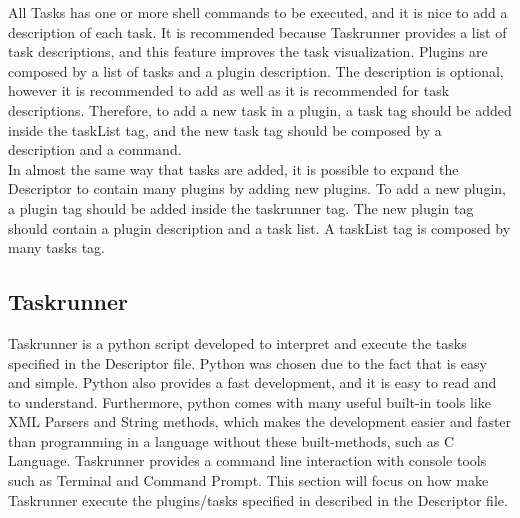 \documentclass[a4paper, 12pt]{article}
\begin{document}
\clearpage



	All Tasks has one or more shell commands to be executed, and it is nice to add a description of each task. It is recommended because Taskrunner provides
a list of task descriptions, and this feature improves the task visualization. Plugins are composed by a list of tasks and a plugin description. The
description is optional, however it is recommended to add as well as it is recommended for task descriptions. Therefore, to add a new task in a plugin,
a task tag should be added inside the taskList tag, and the new task tag should be composed by a description and a command.\\

	In almost the same way that tasks are added, it is possible to expand the Descriptor to contain many plugins by adding new plugins. To add a new plugin,
a plugin tag should be added inside the taskrunner tag. The new plugin tag should contain a plugin description and a task list. A taskList tag is
composed by many tasks tag.\\

\subsection{Taskrunner}

	Taskrunner is a python script developed to interpret and execute the tasks specified in the Descriptor file. Python was chosen due to the fact that is
easy and simple. Python also provides a fast development, and it is easy to read and to understand. Furthermore, python comes with many useful built-in
tools like XML Parsers and String methods, which makes the development easier and faster than programming in a language without these built-methods,
such as C Language. Taskrunner provides a command line interaction with console tools such as Terminal and Command Prompt. This section will focus on
how make Taskrunner execute the plugins/tasks specified in described in the Descriptor file.\\
\end{document}
